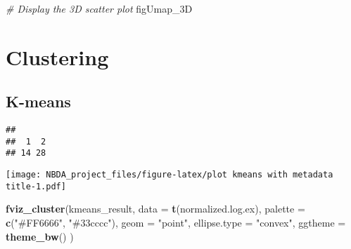 \documentclass[
]{article}
\newenvironment{Shaded}{\begin{snugshade}}{\end{snugshade}}
\newcommand{\AttributeTok}[1]{\textcolor[rgb]{0.13,0.29,0.53}{#1}}
\newcommand{\CommentTok}[1]{\textcolor[rgb]{0.56,0.35,0.01}{\textit{#1}}}
\newcommand{\DecValTok}[1]{\textcolor[rgb]{0.00,0.00,0.81}{#1}}
\newcommand{\FunctionTok}[1]{\textcolor[rgb]{0.13,0.29,0.53}{\textbf{#1}}}
\newcommand{\NormalTok}[1]{#1}
\newcommand{\OtherTok}[1]{\textcolor[rgb]{0.56,0.35,0.01}{#1}}
\newcommand{\SpecialCharTok}[1]{\textcolor[rgb]{0.81,0.36,0.00}{\textbf{#1}}}
\newcommand{\StringTok}[1]{\textcolor[rgb]{0.31,0.60,0.02}{#1}}
\begin{document}
\begin{Shaded}
\begin{Highlighting}[]
\CommentTok{\# Display the 3D scatter plot}
\NormalTok{figUmap\_3D}
\end{Highlighting}
\end{Shaded}

\section{Clustering}\label{clustering}

\subsection{K-means}\label{k-means}

\begin{Shaded}
\end{Shaded}

\begin{verbatim}
## 
##  1  2 
## 14 28
\end{verbatim}

\begin{Shaded}
\end{Shaded}

\texttt{[image: NBDA\_project\_files/figure-latex/plot kmeans with metadata title-1.pdf]}

\begin{Shaded}
\begin{Highlighting}[]
\FunctionTok{fviz\_cluster}\NormalTok{(kmeans\_result, }\AttributeTok{data =} \FunctionTok{t}\NormalTok{(normalized.log.ex),}
              \AttributeTok{palette =} \FunctionTok{c}\NormalTok{(}\StringTok{"\#FF6666"}\NormalTok{, }\StringTok{"\#33cccc"}\NormalTok{), }
             \AttributeTok{geom =} \StringTok{"point"}\NormalTok{,}
             \AttributeTok{ellipse.type =} \StringTok{"convex"}\NormalTok{, }
             \AttributeTok{ggtheme =} \FunctionTok{theme\_bw}\NormalTok{()}
\NormalTok{             )}
\end{Highlighting}
\end{Shaded}
\end{document}
